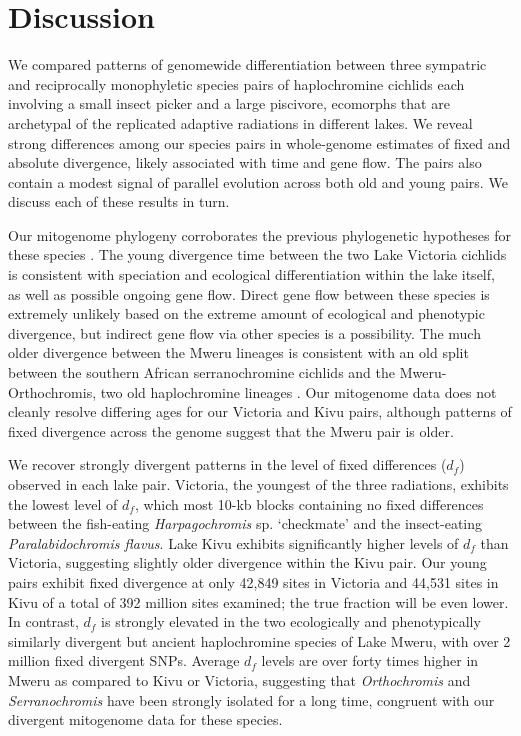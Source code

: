 \section{Discussion}

We compared patterns of genomewide differentiation between three sympatric and reciprocally monophyletic species pairs of haplochromine cichlids each involving a small insect picker and a large piscivore, ecomorphs that are archetypal of the replicated adaptive radiations in different lakes. We reveal strong differences among our species pairs in whole-genome estimates of fixed and absolute divergence, likely associated with time and gene flow. The pairs also contain a modest signal of parallel evolution across both old and young pairs. We discuss each of these results in turn.

Our mitogenome phylogeny corroborates the previous phylogenetic hypotheses for these species \cite{wagner2012ecological}. The young divergence time between the two Lake Victoria cichlids is consistent with speciation and ecological differentiation within the lake itself, as well as possible ongoing gene flow. Direct gene flow between these species is extremely unlikely based on the extreme amount of ecological and phenotypic divergence, but indirect gene flow via other species is a possibility. The much older divergence between the Mweru lineages is consistent with an old split between the southern African serranochromine cichlids and the Mweru-Orthochromis, two old haplochromine lineages \cite{schwarzer2012repeated, wagner2012ecological}. Our mitogenome data does not cleanly resolve differing ages for our Victoria and Kivu pairs, although patterns of fixed divergence across the genome suggest that the Mweru pair is older.

We recover strongly divergent patterns in the level of fixed differences ($d_f$) observed in each lake pair. Victoria, the youngest of the three radiations, exhibits the lowest level of $d_f$, which most 10-kb blocks containing no fixed differences between the fish-eating {\em Harpagochromis} sp. `checkmate' and the insect-eating {\em Paralabidochromis flavus}. Lake Kivu exhibits significantly higher levels of $d_f$ than Victoria, suggesting slightly older divergence within the Kivu pair. Our young pairs exhibit fixed divergence at only 42,849 sites in Victoria and 44,531 sites in Kivu of a total of 392 million sites examined; the true fraction will be even lower. In contrast, $d_f$ is strongly elevated in the two ecologically and phenotypically similarly divergent but ancient haplochromine species of Lake Mweru, with over 2 million fixed divergent SNPs. Average $d_f$ levels are over forty times higher in Mweru as compared to Kivu or Victoria, suggesting that {\em Orthochromis} and {\em Serranochromis} have been strongly isolated for a long time, congruent with our divergent mitogenome data for these species.

